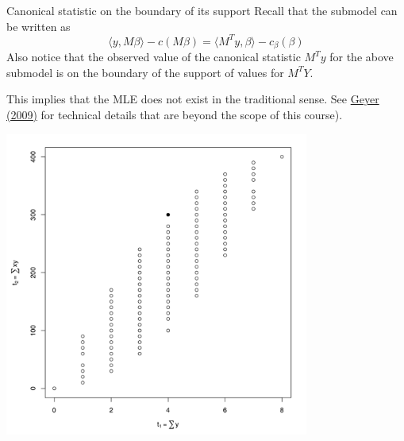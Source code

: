 \documentclass[
  ignorenonframetext,
]{beamer}
\begin{document}
\begin{frame}{Canonical statistic on the boundary of its support}
\protect\hypertarget{canonical-statistic-on-the-boundary-of-its-support}{}
Recall that the submodel can be written as \[
  \langle y, M\beta \rangle - c(M\beta) = \langle M^Ty, \beta \rangle - c_\beta(\beta)
\] \vspace{12pt} Also notice that the observed value of the canonical
statistic \(M^Ty\) for the above submodel is on the boundary of the
support of values for \(M^TY\).

\vspace{12pt}

This implies that the MLE does not exist in the traditional sense. See
\href{https://projecteuclid.org/euclid.ejs/1239716414}{Geyer (2009)} for
technical details that are beyond the scope of this course).
\end{frame}

\begin{frame}{}
\protect\hypertarget{section-7}{}
\begin{center}
\includegraphics[width = 0.75\textwidth]{boundaryMtY.png}
\end{center}
\end{frame}
\end{document}
